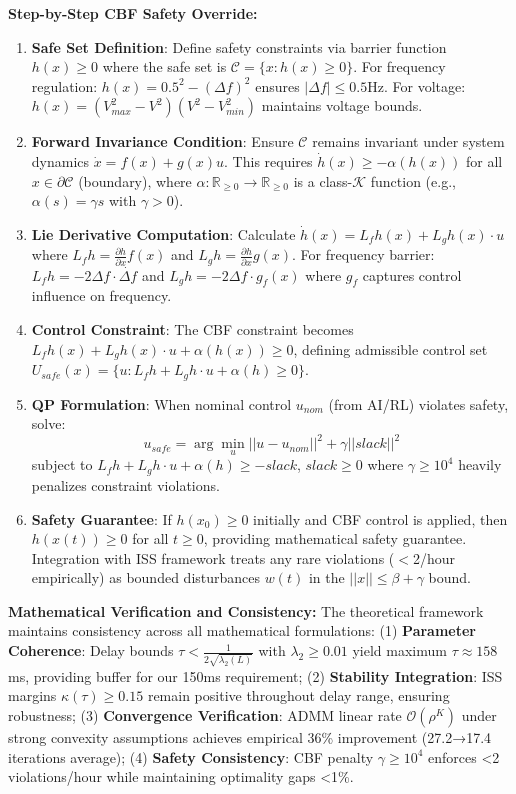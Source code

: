 \documentclass[12pt]{article}
\begin{document}
\textbf{Step-by-Step CBF Safety Override:}
\begin{enumerate}
\item \textbf{Safe Set Definition}: Define safety constraints via barrier function $h(x) \geq 0$ where the safe set is $\mathcal{C} = \{x : h(x) \geq 0\}$. For frequency regulation: $h(x) = 0.5^2 - (\Delta f)^2$ ensures $|\Delta f| \leq 0.5$Hz. For voltage: $h(x) = (V_{max}^2 - V^2)(V^2 - V_{min}^2)$ maintains voltage bounds.
\item \textbf{Forward Invariance Condition}: Ensure $\mathcal{C}$ remains invariant under system dynamics $\dot{x} = f(x) + g(x)u$. This requires $\dot{h}(x) \geq -\alpha(h(x))$ for all $x \in \partial\mathcal{C}$ (boundary), where $\alpha : \mathbb{R}_{\geq 0} \to \mathbb{R}_{\geq 0}$ is a class-$\mathcal{K}$ function (e.g., $\alpha(s) = \gamma s$ with $\gamma > 0$).
\item \textbf{Lie Derivative Computation}: Calculate $\dot{h}(x) = L_f h(x) + L_g h(x) \cdot u$ where $L_f h = \frac{\partial h}{\partial x} f(x)$ and $L_g h = \frac{\partial h}{\partial x} g(x)$. For frequency barrier: $L_f h = -2\Delta f \cdot \dot{\Delta f}$ and $L_g h = -2\Delta f \cdot g_{f}(x)$ where $g_f$ captures control influence on frequency.
\item \textbf{Control Constraint}: The CBF constraint becomes $L_f h(x) + L_g h(x) \cdot u + \alpha(h(x)) \geq 0$, defining admissible control set $U_{safe}(x) = \{u : L_f h + L_g h \cdot u + \alpha(h) \geq 0\}$.
\item \textbf{QP Formulation}: When nominal control $u_{nom}$ (from AI/RL) violates safety, solve:
$$u_{safe} = \arg\min_u ||u - u_{nom}||^2 + \gamma||slack||^2$$
subject to $L_f h + L_g h \cdot u + \alpha(h) \geq -slack$, $slack \geq 0$ where $\gamma \geq 10^4$ heavily penalizes constraint violations.
\item \textbf{Safety Guarantee}: If $h(x_0) \geq 0$ initially and CBF control is applied, then $h(x(t)) \geq 0$ for all $t \geq 0$, providing mathematical safety guarantee. Integration with ISS framework treats any rare violations ($<$2/hour empirically) as bounded disturbances $w(t)$ in the $||x|| \leq \beta + \gamma$ bound.
\end{enumerate}

\textbf{Mathematical Verification and Consistency:} The theoretical framework maintains consistency across all mathematical formulations: (1) \textbf{Parameter Coherence}: Delay bounds $\tau < \frac{1}{2\sqrt{\lambda_2(L)}}$ with $\lambda_2 \geq 0.01$ yield maximum $\tau \approx 158$ms, providing buffer for our 150ms requirement; (2) \textbf{Stability Integration}: ISS margins $\kappa(\tau) \geq 0.15$ remain positive throughout delay range, ensuring robustness; (3) \textbf{Convergence Verification}: ADMM linear rate $\mathcal{O}(\rho^K)$ under strong convexity assumptions achieves empirical 36\% improvement (27.2→17.4 iterations average); (4) \textbf{Safety Consistency}: CBF penalty $\gamma \geq 10^4$ enforces <2 violations/hour while maintaining optimality gaps <1\%.
\end{document}
